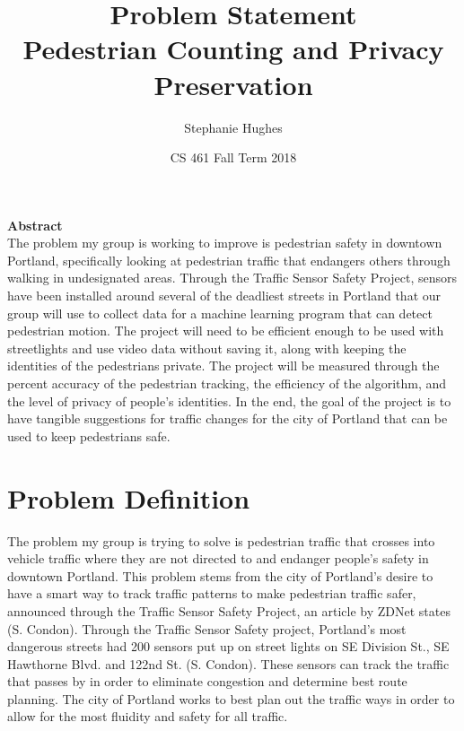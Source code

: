 \documentclass[letterpaper,10pt]{article}
\title{%
  Problem Statement \\
  \large Pedestrian Counting and Privacy Preservation}
\author{Stephanie Hughes}
\date{CS 461 Fall Term 2018}
\begin{document}
\begin{titlepage}

\maketitle 

\textbf{\large Abstract} \\
The problem my group is working to improve is pedestrian safety in downtown Portland, specifically looking at pedestrian traffic that endangers others through walking in undesignated areas. Through the Traffic Sensor Safety Project, sensors have been installed around several of the deadliest streets in Portland that our group will use to collect data for a machine learning program that can detect pedestrian motion. The project will need to be efficient enough to be used with streetlights and use video data without saving it, along with keeping the identities of the pedestrians private. The project will be measured through the percent accuracy of the pedestrian tracking, the efficiency of the algorithm, and the level of privacy of people’s identities. In the end, the goal of the project is to have tangible suggestions for traffic changes for the city of Portland that can be used to keep pedestrians safe.

\end{titlepage}


\section{Problem Definition}
The problem my group is trying to solve is pedestrian traffic that crosses into vehicle traffic where they are not directed to and endanger people’s safety in downtown Portland. This problem stems from the city of Portland’s desire to have a smart way to track traffic patterns to make pedestrian traffic safer, announced through the Traffic Sensor Safety Project, an article by ZDNet states (S. Condon). Through the Traffic Sensor Safety project, Portland’s most dangerous streets had 200 sensors put up on street lights on SE Division St., SE Hawthorne Blvd. and 122nd St. (S. Condon). These sensors can track the traffic that passes by in order to eliminate congestion and determine best route planning. The city of Portland works to best plan out the traffic ways in order to allow for the most fluidity and safety for all traffic. 
\end{document}
